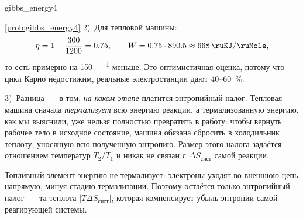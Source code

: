 \begin{problem}{}{gibbs_energy4}
\begin{sol}{\ref{prob:gibbs_energy4}}
        2)~Для тепловой машины:
        \begin{equation*}
            \eta = 1 - \frac{\num{300}}{\num{1200}} = \num{0,75}, \qquad W = \num{0,75} \cdot \num{890,5} \approx \qty{668}{\ruKJ\per\ruMole},
        \end{equation*}
        то есть примерно на \qty{150}{\ruKJ\per\ruMole} меньше. Это оптимистичная оценка, потому что цикл Карно недостижим, реальные электростанции дают \num{40}--\qty{60}{\percent}.

        3)~Разница~--- в том, \emph{на каком этапе} платится энтропийный налог. Тепловая машина сначала \emph{термализует} всю энергию реакции, а термализованную энергию, как мы выяснили, уже нельзя полностью превратить в работу: чтобы вернуть рабочее тело в исходное состояние, машина обязана сбросить в холодильник теплоту, уносящую всю полученную энтропию. Размер этого налога задаётся отношением температур $T_2/T_1$ и никак не связан с $\Delta S_{\text{сист}}$ самой реакции.

        Топливный элемент энергию не термализует: электроны уходят во внешнюю цепь напрямую, минуя стадию термализации. Поэтому остаётся только энтропийный налог~--- та теплота $|T \Delta S_{\text{сист}}|$, которая компенсирует убыль энтропии самой реагирующей системы.
    \end{sol}
\end{problem}

